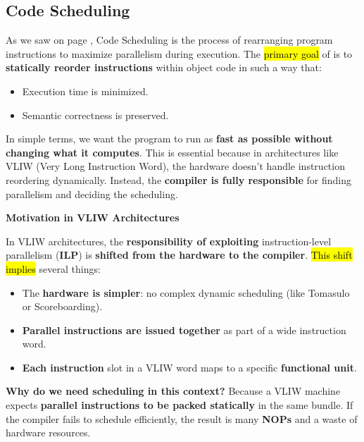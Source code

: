 \subsection{Code Scheduling}

As we saw on page , Code Scheduling is the process of rearranging program instructions to maximize parallelism during execution. The \hl{primary goal} of  is to \textbf{statically reorder instructions} within object code in such a way that:
\begin{itemize}[label=\textcolor{Green3}{}]
    \item Execution time is minimized.
    \item Semantic correctness is preserved.
\end{itemize}
In simple terms, we want the program to run as \textbf{fast as possible without changing what it computes}. This is essential because in architectures like VLIW (Very Long Instruction Word), the hardware doesn't handle instruction reordering dynamically. Instead, the \textbf{compiler is fully responsible} for finding parallelism and deciding the scheduling.

\highspace
\begin{flushleft}
    \textcolor{Green3}{ \textbf{Motivation in VLIW Architectures}}
\end{flushleft}
In VLIW architectures, the \textbf{responsibility of exploiting} instruction-level parallelism (\textbf{ILP}) is \textbf{shifted from the hardware to the compiler}. \hl{This shift implies} several things:
\begin{itemize}
    \item The \textbf{hardware is simpler}: no complex dynamic scheduling (like Tomasulo or Scoreboarding).
    \item \textbf{Parallel instructions are issued together} as part of a wide instruction word.
    \item \textbf{Each instruction} slot in a VLIW word maps to a specific \textbf{functional unit}.
\end{itemize}
\textcolor{Green3}{ \textbf{Why do we need scheduling in this context?}} Because a VLIW machine expects \textbf{parallel instructions to be packed statically} in the same bundle. If the compiler fails to schedule efficiently, the result is many \textbf{NOPs} and a waste of hardware resources.

